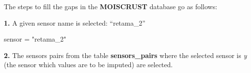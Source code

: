 \documentclass[]{article}
\newenvironment{Shaded}{\begin{snugshade}}{\end{snugshade}}
\newcommand{\KeywordTok}[1]{\textcolor[rgb]{0.13,0.29,0.53}{\textbf{#1}}}
\newcommand{\NormalTok}[1]{#1}
\newcommand{\OperatorTok}[1]{\textcolor[rgb]{0.81,0.36,0.00}{\textbf{#1}}}
\newcommand{\StringTok}[1]{\textcolor[rgb]{0.31,0.60,0.02}{#1}}
\begin{document}
The steps to fill the gaps in the \textbf{MOISCRUST} database go as
follows:

\textbf{1.} A given sensor name is selected: ``retama\_2''

\begin{Shaded}
\begin{Highlighting}[]
\NormalTok{sensor =}\StringTok{ "retama_2"}
\end{Highlighting}
\end{Shaded}

\textbf{2.} The sensors pairs from the table \textbf{sensors\_pairs}
where the selected sensor is \emph{y} (the sensor which values are to be
imputed) are selected.

\begin{Shaded}
\end{Shaded}
\end{document}
